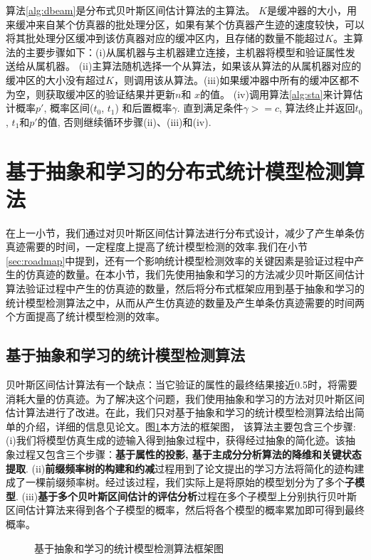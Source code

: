 算法\ref{alg:dbeam}是分布式贝叶斯区间估计算法的主算法。 \emph{$K$}是缓冲器的大小，用来缓冲来自某个仿真器的批处理分区，如果有某个仿真器产生迹的速度较快，可以将其批处理分区缓冲到该仿真器对应的缓冲区内，且存储的数量不能超过\emph{$K$}。主算法的主要步骤如下：(i)从属机器与主机器建立连接，主机器将模型和验证属性发送给从属机器。 (ii)主算法随机选择一个从算法，如果该从算法的从属机器对应的缓冲区的大小没有超过\emph{$K$}，则调用该从算法。(iii)如果缓冲器中所有的缓冲区都不为空，则获取缓冲区的验证结果并更新\emph{$n$}和 \emph{$x$}的值。 (iv)调用算法\ref{alg:sta}来计算估计概率$p'$, 概率区间($t_0$, $t_1$) 和后置概率$\gamma$. 直到满足条件$\gamma >= c$, 算法终止并返回$t_0$, $t_1$和$p'$的值, 否则继续循环步骤(ii)、(iii)和(iv).
\section{基于抽象和学习的分布式统计模型检测算法}
在上一小节，我们通过对贝叶斯区间估计算法进行分布式设计，减少了产生单条仿真迹需要的时间，一定程度上提高了统计模型检测的效率.我们在小节\ref{sec:roadmap}中提到，还有一个影响统计模型检测效率的关键因素是验证过程中产生的仿真迹的数量。在本小节，我们先使用抽象和学习的方法减少贝叶斯区间估计算法验证过程中产生的仿真迹的数量，然后将分布式框架应用到基于抽象和学习的统计模型检测算法之中，从而从产生仿真迹的数量及产生单条仿真迹需要的时间两个方面提高了统计模型检测的效率。
\subsection{基于抽象和学习的统计模型检测算法}
贝叶斯区间估计算法有一个缺点：当它验证的属性的最终结果接近0.5时，将需要消耗大量的仿真迹。为了解决这个问题，我们使用抽象和学习的方法对贝叶斯区间估计算法进行了改进。在此，我们只对基于抽象和学习的统计模型检测算法给出简单的介绍，详细的信息见论文\cite{jiangkaiqiang2016}。图\ref{al-smc}本方法的框架图， 该算法主要包含三个步骤: (i)我们将模型仿真生成的迹输入得到抽象过程中，获得经过抽象的简化迹。该抽象过程又包含三个步骤：\textbf{基于属性的投影, 基于主成分分析算法的降维\cite{dunteman1989principal}和关键状态提取}. (ii)\textbf{前缀频率树的构建和约减}过程用到了论文\cite{carrasco1994learning}提出的学习方法将简化的迹构建成了一棵前缀频率树。经过该过程，我们实际上是将原始的模型划分为了多个\textbf{子模型}. (iii)\textbf{基于多个贝叶斯区间估计的评估分析}过程在多个子模型上分别执行贝叶斯区间估计算法来得到各个子模型的概率，然后将各个模型的概率累加即可得到最终概率。
\begin{figure}[htbp]
	\caption{基于抽象和学习的统计模型检测算法框架图}\label{al-smc}
\end{figure}
